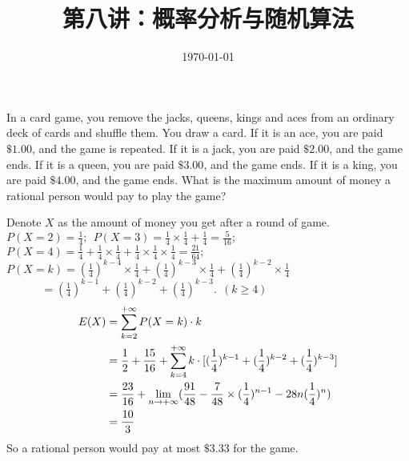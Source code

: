 \documentclass[12pt, a4paper, UTF8]{ctexart}
\title{第八讲：概率分析与随机算法}
\date{\today}     %
\begin{document}
\maketitle
\noplagiarism	%
\beginrequired	%

\begin{problem}[CS: 5.6.4]	%
  In a card game, you remove the jacks, queens, kings and aces from an ordinary 
  deck of cards and shuffle them. You draw a card. If it is an ace, you are paid 
  $\$1.00$, and the game is repeated. If it is a jack, you are paid $\$2.00$, and 
  the game ends. If it is a queen, you are paid $\$3.00$, and the game ends. If 
  it is a king, you are paid $\$4.00$, and the game ends. What is the maximum 
  amount of money a rational person would pay to play the game?
\end{problem}


\begin{solution}
  Denote $X$ as the amount of money you get after a round of game.\\
  $P(X = 2) = \frac{1}{4};~~P(X = 3) = \frac{1}{4}\times\frac{1}{4} + \frac{1}{4} = \frac{5}{16};$\\
  $P(X = 4) = \frac{1}{4} + \frac{1}{4}\times\frac{1}{4} + \frac{1}{4}\times\frac{1}{4}\times\frac{1}{4} = \frac{21}{64};$\\
  $P(X = k) = (\frac{1}{4})^{k-4}\times\frac{1}{4} + (\frac{1}{4})^{k-3}\times\frac{1}{4} + (\frac{1}{4})^{k-2}\times\frac{1}{4}$\\
  $~~~~~~~~~~~~~~= (\frac{1}{4})^{k-1} + (\frac{1}{4})^{k-2} + (\frac{1}{4})^{k-3}.~~(k \geq 4)$
  \begin{align}
    E(X) & = \sum_{k=2}^{+\infty} P(X = k)\cdot k \notag \\
         & = \frac{1}{2} + \frac{15}{16} + \sum_{k=4}^{+\infty} k\cdot[(\frac{1}{4})^{k-1} + (\frac{1}{4})^{k-2} + (\frac{1}{4})^{k-3}] \notag \\
         & = \frac{23}{16} + \lim_{n\rightarrow+\infty} (\frac{91}{48} - \frac{7}{48}\times(\frac{1}{4})^{n-1} - 28n(\frac{1}{4})^{n}) \notag \\
         & = \frac{10}{3} \notag
  \end{align}
  So a rational person would pay at most $\$3.33$ for the game.
\end{solution}
\end{document}
